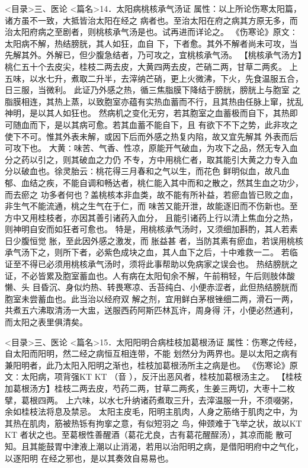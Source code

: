 \documentclass[a4paper,12pt,UTF8,twoside]{ctexbook}
\begin{document}
<目录>三、医论
<篇名>14．太阳病桃核承气汤证
属性：以上所论伤寒太阳篇，诸方虽不一致，大抵皆治太阳在经之 
病者也。至治太阳在府之病其方原无多，而治太阳府病之至剧者，则桃核承气汤是也。试再进而详论之。 
《伤寒论》原文∶太阳病不解，热结膀胱，其人如狂，血自 
下，下者愈。其外不解者尚未可攻，当先解其外。外解已，但少腹急结者，乃可攻之，宜桃核承气汤。 
【桃核承气汤方】桃仁五十个去皮尖，桂枝二两去皮，大黄四两去皮，芒硝二两，甘草二两炙。 
上五味，以水七升，煮取二升半，去滓纳芒硝，更上火微沸，下火，先食温服五合，日三服，当微利。 
此证乃外感之热，循三焦脂膜下降结于膀胱，膀胱上与胞室 
之脂膜相连，其热上蒸，以致胞室亦蕴有实热血蓄而不行，且其热由任脉上窜，扰乱神明，是以其人如狂也。 
然病机之变化无穷，若其胞室之血蓄极而自下，其热即可随血而下，是以其病可愈。若其血蓄不能自下，且 
有欲下不下之势，此非攻之使下不可。惟其外表未解，或因下后而外感之热复内陷，故又宜先解其 
外表而后可攻下也。 
大黄∶味苦、气香、性凉，原能开气破血，为攻下之品，然无专入血分之药以引之，则其破血之力仍 
不专，方中用桃仁者，取其能引大黄之力专入血分以破血也。徐灵胎云∶桃花得三月春和之气以生，而花色 
鲜明似血，故凡血郁、血结之疾，不能自调和畅达者，桃仁能入其中而和之散之，然其生血之功少，而去瘀之 
功多者何也？盖桃核本非血类，故不能有所补益，若瘀血皆已败之血，非生气不能流通，桃之生气在于仁，而 
味苦又能开泄，故能逐旧而不伤新也。至方中又用桂枝者，亦因其善引诸药入血分， 
且能引诸药上行以清上焦血分之热，则神明自安而如狂者可愈也。 
特是，用桃核承气汤时，又须细加斟酌，其人若素日少腹恒觉 胀，至此因外感之激发，而 胀益甚 
者，当防其素有瘀血，若误用桃核承气汤下之，则所下者，必紫色成块之血，其人血下之后，十中难救一二。 
若临证至不得已必须用桃核承气汤时，须将此事帮助以免病家之误会也。 
热结膀胱之证，不必皆累及胞室蓄血也。人有病在太阳旬余不解，午前稍轻，午后则肢体酸懒、头 
目昏沉、身似灼热、转畏寒凉、舌苔纯白、小便赤涩者，此但热结膀胱而胞室未尝蓄血也。此当治以经府双 
解之剂，宜用鲜白茅根锉细二两，滑石一两，共煮五六沸取清汤一大盅，送服西药阿斯匹林瓦许，周身得 
汗，小便必然通利，而太阳之表里俱清矣。 

<目录>三、医论
<篇名>15．太阳阳明合病桂枝加葛根汤证
属性：伤寒之传经，自太阳而阳明，然二经之病恒互相连带，不能 
划然分为两界也。是以太阳之病有兼阳明者，此乃太阳入阳明之渐也，桂枝加葛根汤所主之病是也。 
《伤寒论》原文∶太阳病，项背强KT KT （音 ），反汗出恶风者，桂枝加葛根汤主之。 
【桂枝加葛根汤方】桂枝二两去皮，芍药二两，甘草二两炙，生姜三两切，大枣十二枚擘，葛根四两。 
上六味，以水七升纳诸药煮取三升，去滓温服一升，不须啜粥，余如桂枝法将息及禁忌。 
太阳主皮毛，阳明主肌肉，人身之筋络于肌肉之中，为其热在肌肉，筋被热铄有拘挛之意，有似短羽之 
鸟，伸颈难于飞举之状，故以KT KT 者状之也。至葛根性善醒酒（葛花尤良，古有葛花醒酲汤），其凉而能 
散可知。且其能鼓胃中津液上潮以止消渴，若用以治阳明之病，是借阳明府中之气化，以逐阳明 
在经之邪也，是以其奏效自易易也。 
\end{document}
